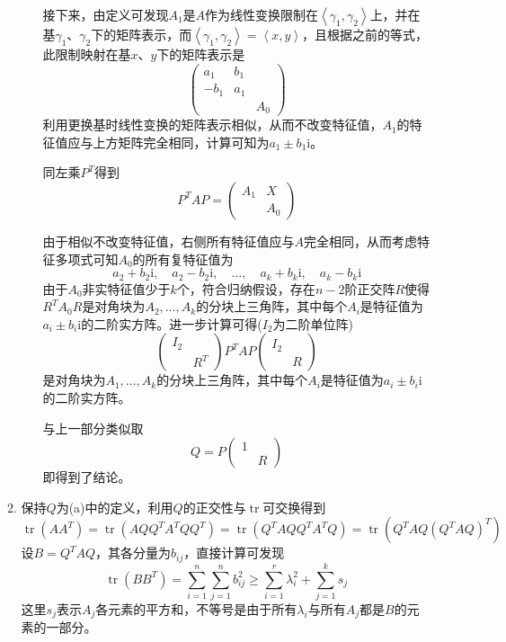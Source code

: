 \documentclass[a4paper,UTF8,fontset=windows,AutoFakeBold]{ctexart}
\DeclareMathOperator{\tr}{tr}
\newcommand*{\ir}{\mathrm{i}}
\begin{document}
\begin{enumerate}
\begin{enumerate}
\begin{itemize}
{                接下来，由定义可发现$A_1$是$A$作为线性变换限制在$\left<\gamma_1,\gamma_2\right>$上，并在基$\gamma_1$、$\gamma_2$下的矩阵表示，而$\left<\gamma_1,\gamma_2\right>=\left<x,y\right>$，且根据之前的等式，此限制映射在基$x$、$y$下的矩阵表示是
                $$\begin{pmatrix}a_1&b_1\\-b_1&a_1\\ &&A_0\end{pmatrix}$$
                利用更换基时线性变换的矩阵表示相似，从而不改变特征值，$A_1$的特征值应与上方矩阵完全相同，计算可知为$a_1\pm b_1\ir$。
            }

            同左乘$P^T$得到
            $$P^TAP=\begin{pmatrix}A_1&X\\ &A_0\end{pmatrix}$$

            由于相似不改变特征值，右侧所有特征值应与$A$完全相同，从而考虑特征多项式可知$A_0$的所有复特征值为
            $$a_2+b_2\ir,\quad a_2-b_2\ir,\quad\dots,\quad a_k+b_k\ir,\quad a_k-b_k\ir$$
            由于$A_0$非实特征值少于$k$个，符合归纳假设，存在$n-2$阶正交阵$R$使得$R^TA_0R$是对角块为$A_2,\dots,A_k$的分块上三角阵，其中每个$A_i$是特征值为$a_i\pm b_i\ir$的二阶实方阵。进一步计算可得($I_2$为二阶单位阵)
            $$\begin{pmatrix}I_2&\\ &R^T\end{pmatrix}P^TAP\begin{pmatrix}I_2&\\ &R\end{pmatrix}$$
            是对角块为$A_1,\dots,A_k$的分块上三角阵，其中每个$A_i$是特征值为$a_i\pm b_i\ir$的二阶实方阵。

            与上一部分类似取
            $$Q=P\begin{pmatrix}1&\\ &R\end{pmatrix}$$
            即得到了结论。
        \end{itemize}

        \item
        保持$Q$为(a)中的定义，利用$Q$的正交性与$\tr$可交换得到
        $$\tr(AA^T)=\tr(AQQ^TA^TQQ^T)=\tr(Q^TAQQ^TA^TQ)=\tr(Q^TAQ(Q^TAQ)^T)$$
        设$B=Q^TAQ$，其各分量为$b_{ij}$，直接计算可发现
        $$\tr(BB^T)=\sum_{i=1}^n\sum_{j=1}^nb_{ij}^2\ge\sum_{i=1}^r\lambda_i^2+\sum_{j=1}^ks_j$$
        这里$s_j$表示$A_j$各元素的平方和，不等号是由于所有$\lambda_i$与所有$A_j$都是$B$的元素的一部分。


\end{enumerate}
\end{enumerate}
\end{document}
